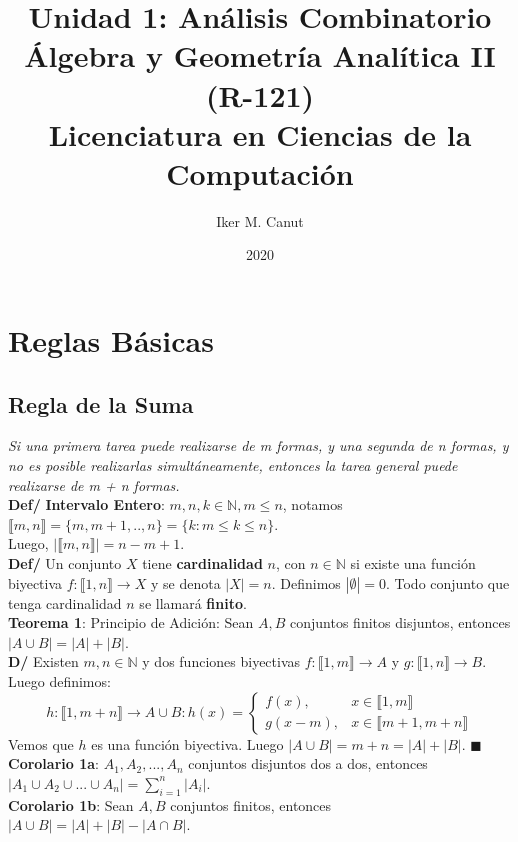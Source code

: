 \documentclass[11pt,a4paper]{article}
\author{Iker M. Canut}
\title{Unidad 1: Análisis Combinatorio\\ \'Algebra y Geometr\'ia Anal\'itica II (R-121)\\Licenciatura en Ciencias de la Computaci\'on}
\date{2020}
\newcommand*{\QEDA}{\null\nobreak\hfill\ensuremath{\blacksquare}}
\begin{document}
\maketitle
\newpage

\section{Reglas B\'asicas}
\subsection{Regla de la Suma}
\textit{Si una primera tarea puede realizarse de m formas, y una segunda de n formas, y no es posible realizarlas simultáneamente, entonces la tarea general puede realizarse de m + n formas.}\\

\textbf{Def/} \textbf{Intervalo Entero}: $m,n,k \in \mathbb{N}, m \leq n$, notamos $\llbracket m,n \rrbracket = \{m,m+1,..,n\} = \{k : m \leq k \leq n\}$.\\ Luego, $|\llbracket m,n \rrbracket| = n-m+1$.\\

\textbf{Def/} Un conjunto $X$ tiene \textbf{cardinalidad} $n$, con $n \in \mathbb{N}$ si existe una funci\'on biyectiva $f : \llbracket 1,n \rrbracket \rightarrow X$ y se denota $|X| = n$. Definimos $|\emptyset| = 0$. Todo conjunto que tenga cardinalidad $n$ se llamar\'a \textbf{finito}.\\

\textbf{Teorema 1}: Principio de Adici\'on: Sean $A,B$ conjuntos finitos disjuntos, entonces $|A \cup B| = |A| + |B|$.\\ 
\textbf{D/} Existen $m,n \in \mathbb{N}$ y dos funciones biyectivas $f : \llbracket 1, m \rrbracket \rightarrow A$ y $g : \llbracket 1, n \rrbracket \rightarrow B$. Luego definimos:
\[ h : \llbracket 1, m+n \rrbracket \rightarrow A \cup B : h(x) = \left\{ \begin{array}{ll}
f(x), & x \in \llbracket 1, m \rrbracket\\
g(x-m), & x \in \llbracket m+1, m+n \rrbracket
\end{array}\right.\]
Vemos que $h$ es una funci\'on biyectiva. Luego $|A \cup B| =m + n =  |A| + |B|$. \QEDA\\

\textbf{Corolario 1a}: $A_1, A_2, ..., A_n$ conjuntos disjuntos dos a dos, entonces $|A_1 \cup A_2 \cup ... \cup A_n| = \sum_{i=1}^n |A_i|$.\\
\textbf{Corolario 1b}: Sean $A,B$ conjuntos finitos, entonces $|A \cup B| = |A| + |B| - |A \cap B|$.\\
\end{document}
